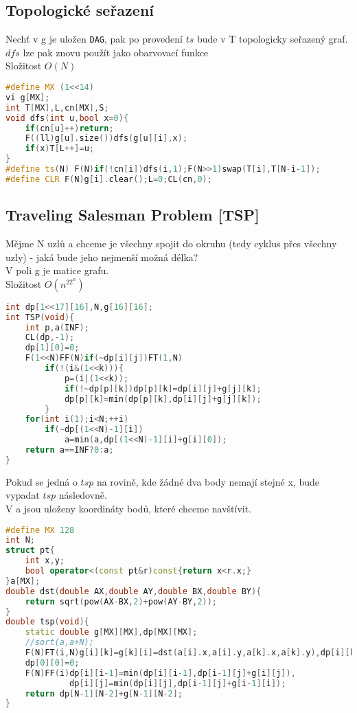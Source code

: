 \documentclass[11pt]{article}
\begin{document}
\subsection{Topologické seřazení}
Nechť v \textsf{g} je uložen \texttt{DAG}, pak po provedení $ts$ bude v \textsf{T} topologicky seřazený graf.
\\$dfs$ lze pak znovu použít jako obarvovací funkce
\\Složitost $O(N)$
\begin{lstlisting}[language=C++]
#define MX (1<<14)
vi g[MX];
int T[MX],L,cn[MX],S;
void dfs(int u,bool x=0){
    if(cn[u]++)return;
    F((ll)g[u].size())dfs(g[u][i],x);
    if(x)T[L++]=u;
}
#define ts(N) F(N)if(!cn[i])dfs(i,1);F(N>>1)swap(T[i],T[N-i-1]);
#define CLR F(N)g[i].clear();L=0;CL(cn,0);
\end{lstlisting}
\subsection{Traveling Salesman Problem [TSP]}
Mějme \textsf{N} uzlů a chceme je všechny spojit do okruhu (tedy cyklus přes všechny uzly) - jaká bude jeho nejmenší možná délka?
\\V poli \textsf{g} je matice grafu.
\\Složitost $O(n^22^n)$
\begin{lstlisting}[language=C++]
int dp[1<<17][16],N,g[16][16];
int TSP(void){
    int p,a(INF);
    CL(dp,-1);
    dp[1][0]=0;
    F(1<<N)FF(N)if(~dp[i][j])FT(1,N)
        if(!(i&(1<<k))){
            p=(i|(1<<k));
            if(!~dp[p][k])dp[p][k]=dp[i][j]+g[j][k];
            dp[p][k]=min(dp[p][k],dp[i][j]+g[j][k]);
        }
    for(int i(1);i<N;++i) 
        if(~dp[(1<<N)-1][i]) 
            a=min(a,dp[(1<<N)-1][i]+g[i][0]);
    return a==INF?0:a;
}
\end{lstlisting}
Pokud se jedná o $tsp$ na rovině, kde žádné dva body nemají stejné \textsf{x}, bude vypadat $tsp$ následovně.
\\V \textsf{a} jsou uloženy koordináty bodů, které chceme navštívit.
\begin{lstlisting}[language=C++]
#define MX 128
int N;
struct pt{
    int x,y;
    bool operator<(const pt&r)const{return x<r.x;}
}a[MX];
double dst(double AX,double AY,double BX,double BY){
    return sqrt(pow(AX-BX,2)+pow(AY-BY,2));
}
double tsp(void){
    static double g[MX][MX],dp[MX][MX];
    //sort(a,a+N);
    F(N)FT(i,N)g[i][k]=g[k][i]=dst(a[i].x,a[i].y,a[k].x,a[k].y),dp[i][k]=dp[k][i]=1<<30;
    dp[0][0]=0;
    F(N)FF(i)dp[i][i-1]=min(dp[i][i-1],dp[i-1][j]+g[i][j]),
             dp[i][j]=min(dp[i][j],dp[i-1][j]+g[i-1][i]);
    return dp[N-1][N-2]+g[N-1][N-2];
}
\end{lstlisting}
\end{document}
